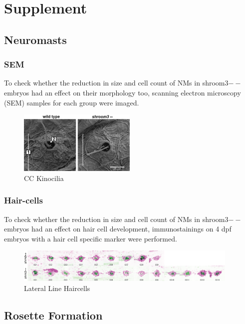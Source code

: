 \documentclass[11pt,singlespacinge,twoside]{reedthesis} %
\begin{document}
\appendix

\hypertarget{supplement}{%
\chapter{Supplement}\label{supplement}}

\hypertarget{neuromasts}{%
\section{Neuromasts}\label{neuromasts}}

\hypertarget{sem}{%
\subsection{SEM}\label{sem}}

To check whether the reduction in size and cell count of NMs in shroom3\(--\) embryos had an effect on their morphology too, scanning electron microscopy (SEM) samples for each group were imaged.


\begin{figure}

{\centering \includegraphics[width=0.50\textwidth]{figures/supp/sem} 

}

\caption[CC Kinocilia]{CC Kinocilia}\label{fig:suppsem}
\end{figure}
\hypertarget{hair-cells-1}{%
\subsection{Hair-cells}\label{hair-cells-1}}

To check whether the reduction in size and cell count of NMs in shroom3\(--\) embryos had an effect on hair cell development, immunostainings on 4 dpf embryos with a hair cell specific marker were performed.


\begin{figure}

{\centering \includegraphics[width=0.95\textwidth]{figures/supp/ll_hc} 

}

\caption[Lateral Line Haircells]{Lateral Line Haircells}\label{fig:suppllhc}
\end{figure}
\hypertarget{rosette-formation-1}{%
\section{Rosette Formation}\label{rosette-formation-1}}
\end{document}
